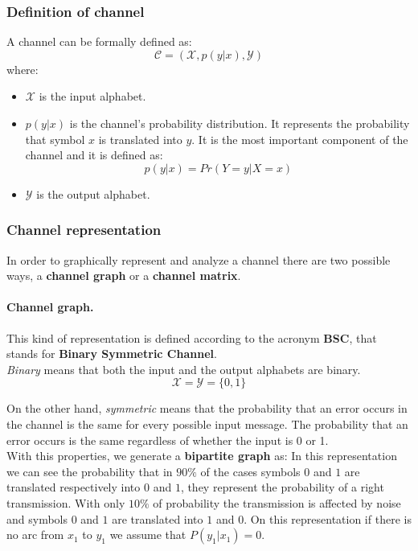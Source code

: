 \subsubsection{Definition of channel}
A channel can be formally defined as:
$$\mathcal{C} = (\mathcal{X}, p(y|x), \mathcal{Y})$$
where:
\begin{itemize}
	\item $\mathcal{X}$ is the input alphabet.
	\item $p(y|x)$ is the channel's probability distribution. It represents the probability that symbol $x$ is translated into $y$. It is the most important component of the channel and it is defined as:
	$$p(y|x) = Pr(Y=y | X = x)$$
	\item $\mathcal{Y}$ is the output alphabet.
\end{itemize}

\subsubsection{Channel representation}
In order to graphically represent and analyze a channel there are two possible ways, a \textbf{channel graph} or a \textbf{channel matrix}.

\paragraph*{Channel graph.} This kind of representation is defined according to the acronym \textbf{BSC}, that stands for \textbf{Binary Symmetric Channel}.\\
\textit{Binary} means that both the input and the output alphabets are binary.
$$\mathcal{X} = \mathcal{Y} = \{0,1\}$$


On the other hand, \textit{symmetric} means that the probability that an error occurs in the channel is the same for every possible input message. The probability that an error occurs is the same regardless of whether the input is 0 or 1.\\
With this properties, we generate a \textbf{bipartite graph} as:
In this representation we can see the probability that in $90\%$ of the cases symbols $0$ and $1$ are translated respectively into $0$ and $1$, they represent the probability of a right transmission. With only $10\%$ of probability the transmission is affected by noise and symbols $0$ and $1$ are translated into $1$ and $0$.
On this representation if there is no arc from $x_1$ to $y_1$ we assume that $P(y_1| x_1) = 0$. 
